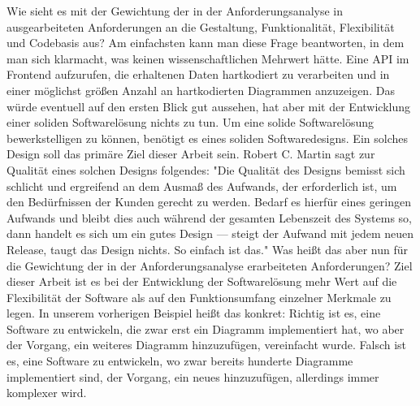 Wie sieht es mit der Gewichtung der in der Anforderungsanalyse in 
ausgearbeiteten Anforderungen an die Gestaltung, Funktionalität, Flexibilität und Codebasis aus?
Am einfachsten kann man diese Frage beantworten, in dem man sich klarmacht, was keinen wissenschaftlichen
Mehrwert hätte. Eine API im Frontend aufzurufen, die erhaltenen Daten hartkodiert zu verarbeiten und
in einer möglichst größen Anzahl an hartkodierten Diagrammen anzuzeigen. Das würde eventuell auf den
ersten Blick gut aussehen, hat aber mit der Entwicklung einer soliden Softwarelösung nichts zu tun.
Um eine solide Softwarelösung bewerkstelligen zu können, benötigt es eines soliden Softwaredesigns.
Ein solches Design soll das primäre Ziel dieser Arbeit sein. Robert C. Martin sagt zur Qualität eines
solchen Designs folgendes:
"Die Qualität des Designs bemisst sich schlicht und ergreifend an dem Ausmaß des Aufwands, der
erforderlich ist, um den Bedürfnissen der Kunden gerecht zu werden. Bedarf es hierfür eines
geringen Aufwands und bleibt dies auch während der gesamten Lebenszeit des Systems so,
dann handelt es sich um ein gutes Design — steigt der Aufwand mit jedem neuen Release,
taugt das Design nichts. So einfach ist das."\cite[S. 30]{RobertC.Martin2018} Was heißt
das aber nun für die Gewichtung der in der Anforderungsanalyse erarbeiteten Anforderungen?
Ziel dieser Arbeit ist es bei der Entwicklung der Softwarelösung mehr Wert auf die Flexibilität
der Software als auf den Funktionsumfang einzelner Merkmale zu legen. In unserem
vorherigen Beispiel heißt das konkret: Richtig ist es, eine Software zu entwickeln, die zwar erst ein Diagramm
implementiert hat, wo aber der Vorgang, ein weiteres Diagramm hinzuzufügen, vereinfacht wurde.
Falsch ist es, eine Software zu entwickeln, wo zwar bereits hunderte Diagramme implementiert sind,
der Vorgang, ein neues hinzuzufügen, allerdings immer komplexer wird.

